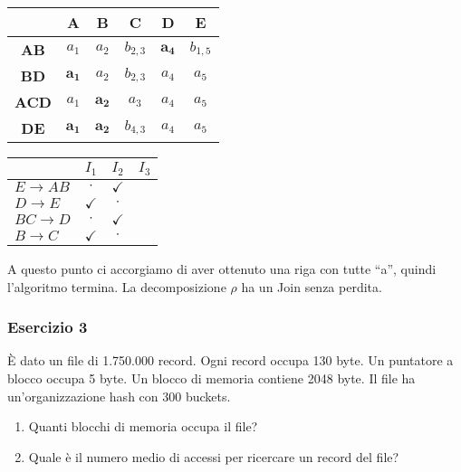   \begin{multicols}{2}
   \begin{center}
  \begin{tabular}{c|c|c|c|c|c}
    & \textbf{A} & \textbf{B} &\textbf{C} &\textbf{D}     &\textbf{E}\\
   \hline
   \textbf{AB} & $a_1$ & $a_2$ & $b_{2,3}$ & $\mathbf{a_4}$ & $b_{1,5}$ \\
   \hline
   \textbf{BD}  &$\mathbf{a_1}$ & $a_2$  & $b_{2,3}$ & $a_4$ & $a_5$ \\
   \hline
   \textbf{ACD} & $a_1$ & $\mathbf{a_2}$  & $a_3$ & $a_4$ & $a_5$\\
    \hline
   \textbf{DE} & $\mathbf{a_1}$ & $\mathbf{a_2}$  & $b_{4,3}$ & $a_4$ & $a_5$\\
  \end{tabular}
 \end{center}
 
  \begin{center}
  \begin{tabular}{l|c|c|c}
   & $I_1$ & $I_2$ & $I_3$\\
   \hline
   $E\rightarrow AB$ & $\cdot$ & $\checkmark$ \\
   $D\rightarrow E$ & $\checkmark$ & $\cdot$ \\
   $BC\rightarrow D$ & $\cdot$ & $\checkmark$ \\
   $B\rightarrow C$ & $\checkmark$ & $\cdot$ \\
   \end{tabular}
 \end{center}
 \end{multicols}
A questo punto ci accorgiamo di aver ottenuto una riga con tutte ``a'', quindi l'algoritmo termina. La decomposizione $\rho$ 
ha un Join senza perdita.

 
\subsubsection{Esercizio 3}
\`E dato un file di 1.750.000 record. Ogni record occupa 130 byte. Un puntatore a blocco occupa 5 byte. 
Un blocco di memoria contiene 2048 byte. Il file ha un’organizzazione hash con 300 buckets.
\begin{enumerate}
 \item Quanti blocchi di memoria occupa il file?
 \item Quale è il numero medio di accessi per ricercare un record del file?
\end{enumerate}


